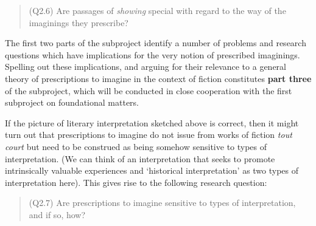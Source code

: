 \vspace{-.2cm}
\begin{quote}
(Q2.6) Are passages of \emph{showing} special with regard to the way of the imaginings they prescribe?
\end{quote}
\vspace{-.2cm}

\noindent The first two parts of the subproject identify a number of problems and research questions which have implications for the very notion of prescribed imaginings. Spelling out these implications, and arguing for their relevance to a general theory of prescriptions to imagine in the context of fiction constitutes \textbf{part three} of the subproject, which will be conducted in close cooperation with the {first subproject on foundational matters}.

If the picture of literary interpretation sketched above is correct, then it might turn out that prescriptions to imagine do not issue from works of fiction \emph{tout court} but need to be construed as being somehow sensitive to types of interpretation. (We can think of an interpretation that seeks to promote intrinsically valuable experiences and `historical interpretation' as two types of interpretation here). This gives rise to the following research question:

\vspace{-.2cm}
\begin{quote}
(Q2.7)  Are prescriptions to imagine sensitive to types of interpretation, and if so, how?
\end{quote}
\vspace{-.2cm}

